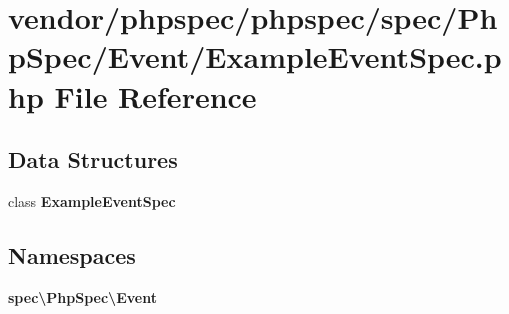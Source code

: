 \section{vendor/phpspec/phpspec/spec/\+Php\+Spec/\+Event/\+Example\+Event\+Spec.php File Reference}
\label{_example_event_spec_8php}
\subsection*{Data Structures}
\begin{DoxyCompactItemize}
\item 
class {\bf Example\+Event\+Spec}
\end{DoxyCompactItemize}
\subsection*{Namespaces}
\begin{DoxyCompactItemize}
\item 
 {\bf spec\textbackslash{}\+Php\+Spec\textbackslash{}\+Event}
\end{DoxyCompactItemize}
